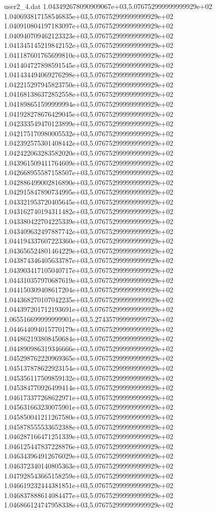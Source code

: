 \begin{filecontents}{user2_4.dat}
1.043492678090909067e+03,5.076752999999999929e+02
1.040693817158546835e+03,5.076752999999999929e+02
1.040910804197183097e+03,5.076752999999999929e+02
1.040940709462123323e+03,5.076752999999999929e+02
1.041345145219842152e+03,5.076752999999999929e+02
1.041187601765699810e+03,5.076752999999999929e+02
1.041404727898591545e+03,5.076752999999999929e+02
1.041434494069276298e+03,5.076752999999999929e+02
1.042215297945823750e+03,5.076752999999999929e+02
1.041681386372852558e+03,5.076752999999999929e+02
1.041898651599999994e+03,5.076752999999999929e+02
1.041928278676429045e+03,5.076752999999999929e+02
1.042333549470123899e+03,5.076752999999999929e+02
1.042175170980005532e+03,5.076752999999999929e+02
1.042392575301408442e+03,5.076752999999999929e+02
1.042422063283582020e+03,5.076752999999999929e+02
1.043961509411764609e+03,5.076752999999999929e+02
1.042668955587158507e+03,5.076752999999999929e+02
1.042886499002816890e+03,5.076752999999999929e+02
1.042915847890734995e+03,5.076752999999999929e+02
1.043321953720405645e+03,5.076752999999999929e+02
1.043162740194311482e+03,5.076752999999999929e+02
1.043380422704225339e+03,5.076752999999999929e+02
1.043409632497887742e+03,5.076752999999999929e+02
1.044194337607223360e+03,5.076752999999999929e+02
1.043656524801464229e+03,5.076752999999999929e+02
1.043874346405633787e+03,5.076752999999999929e+02
1.043903417105040717e+03,5.076752999999999929e+02
1.044310357970687619e+03,5.076752999999999929e+02
1.044150309408617204e+03,5.076752999999999929e+02
1.044368270107042235e+03,5.076752999999999929e+02
1.044397201712193691e+03,5.076752999999999929e+02
1.065516699999999901e+03,5.274357999999999720e+02
1.044644094015770179e+03,5.076752999999999929e+02
1.044862193808450684e+03,5.076752999999999929e+02
1.044890986319346666e+03,5.076752999999999929e+02
1.045298762220969365e+03,5.076752999999999929e+02
1.045137878622923154e+03,5.076752999999999929e+02
1.045356117509859132e+03,5.076752999999999929e+02
1.045384770926499414e+03,5.076752999999999929e+02
1.046173377268622971e+03,5.076752999999999929e+02
1.045631663230075901e+03,5.076752999999999929e+02
1.045850041211267580e+03,5.076752999999999929e+02
1.045878555533652388e+03,5.076752999999999929e+02
1.046287166471251339e+03,5.076752999999999929e+02
1.046125447837228876e+03,5.076752999999999929e+02
1.046343964912676029e+03,5.076752999999999929e+02
1.046372340140805363e+03,5.076752999999999929e+02
1.047928543665158259e+03,5.076752999999999929e+02
1.046619232444381851e+03,5.076752999999999929e+02
1.046837888614084477e+03,5.076752999999999929e+02
1.046866124747958338e+03,5.076752999999999929e+02

\end{filecontents}
